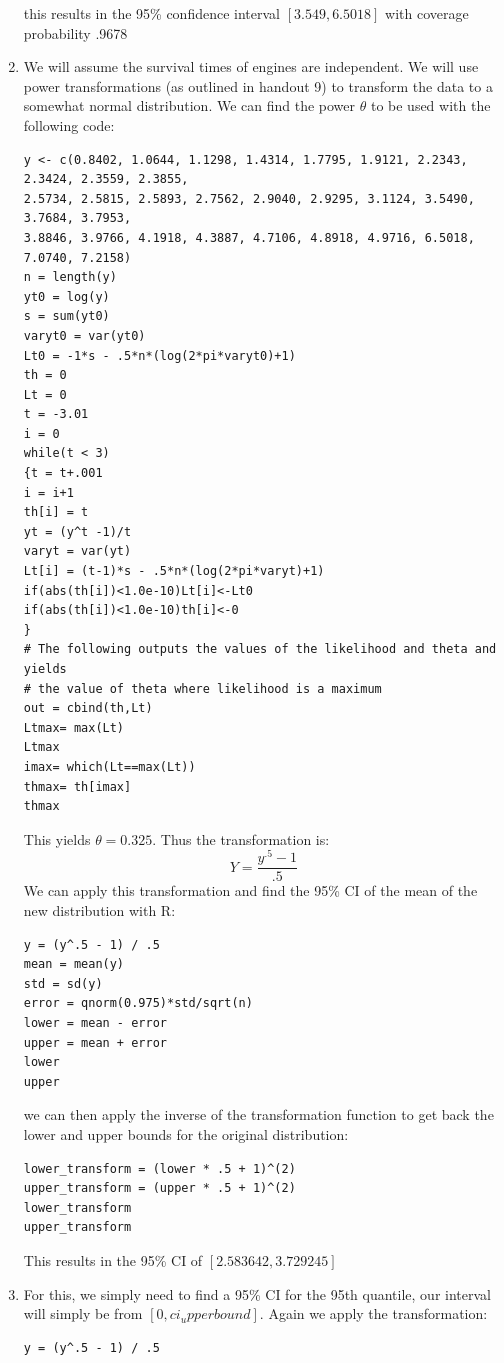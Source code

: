 \documentclass{article}
\begin{document}
\begin{enumerate}
this results in the 95\% confidence interval $[3.549, 6.5018]$ with coverage probability .9678
\item We will assume the survival times of engines are independent. We will use power transformations (as outlined in handout 9) to transform the data to a somewhat normal distribution. We can find the power $\theta$ to be used with the following code: \\
\begin{verbatim}
y <- c(0.8402, 1.0644, 1.1298, 1.4314, 1.7795, 1.9121, 2.2343, 2.3424, 2.3559, 2.3855,
2.5734, 2.5815, 2.5893, 2.7562, 2.9040, 2.9295, 3.1124, 3.5490, 3.7684, 3.7953,
3.8846, 3.9766, 4.1918, 4.3887, 4.7106, 4.8918, 4.9716, 6.5018, 7.0740, 7.2158)
n = length(y)
yt0 = log(y)
s = sum(yt0)
varyt0 = var(yt0)
Lt0 = -1*s - .5*n*(log(2*pi*varyt0)+1)
th = 0
Lt = 0
t = -3.01
i = 0
while(t < 3)
{t = t+.001
i = i+1
th[i] = t
yt = (y^t -1)/t
varyt = var(yt)
Lt[i] = (t-1)*s - .5*n*(log(2*pi*varyt)+1)
if(abs(th[i])<1.0e-10)Lt[i]<-Lt0
if(abs(th[i])<1.0e-10)th[i]<-0
}
# The following outputs the values of the likelihood and theta and yields
# the value of theta where likelihood is a maximum
out = cbind(th,Lt)
Ltmax= max(Lt)
Ltmax
imax= which(Lt==max(Lt))
thmax= th[imax]
thmax
\end{verbatim}
This yields $\theta = 0.325$. Thus the transformation is: \\
\[
Y = \frac{y^{.5} - 1}{.5}
\]
We can apply this transformation and find the 95\% CI of the mean of the new distribution with R: \\
\begin{verbatim}
y = (y^.5 - 1) / .5
mean = mean(y)
std = sd(y)
error = qnorm(0.975)*std/sqrt(n)
lower = mean - error
upper = mean + error
lower
upper
\end{verbatim}
we can then apply the inverse of the transformation function to get back the lower and upper bounds for the original distribution: \\
\begin{verbatim}
lower_transform = (lower * .5 + 1)^(2)
upper_transform = (upper * .5 + 1)^(2)
lower_transform
upper_transform
\end{verbatim}
This results in the 95\% CI of $[2.583642, 3.729245]$
\item For this, we simply need to find a 95\% CI for the 95th quantile, our interval will simply be from $[0, ci_upperbound]$. Again we apply the transformation: \\
\begin{verbatim}
y = (y^.5 - 1) / .5

\end{verbatim}
\end{enumerate}
\end{document}
